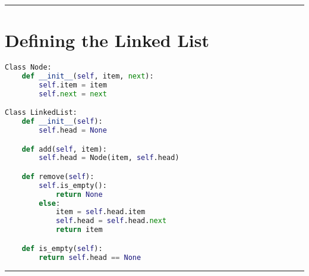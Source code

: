 \documentclass{article}
\begin{document}
\begin{center}
  \rule{0.5\textwidth}{0.4pt}
\end{center}

\pagebreak

\section{Defining the Linked List}
\begin{lstlisting}[language=Python, frame=single]
Class Node:
    def __init__(self, item, next):
        self.item = item
        self.next = next

Class LinkedList:
    def __init__(self):
        self.head = None

    def add(self, item):
        self.head = Node(item, self.head)

    def remove(self):
        self.is_empty():
            return None
        else:
            item = self.head.item
            self.head = self.head.next
            return item

    def is_empty(self):
        return self.head == None
\end{lstlisting}

\begin{center}
  \rule{0.5\textwidth}{0.4pt}
\end{center}
\end{document}

